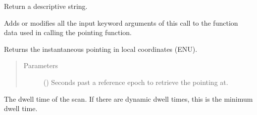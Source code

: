 \documentclass[letterpaper,10pt,english]{sphinxmanual}
\begin{document}
\begin{fulllineitems}

\begin{fulllineitems}
\label{\detokenize{modules/radar_scans:radar_scans.RadarScan.info}}
Return a descriptive string.

\end{fulllineitems}


\begin{fulllineitems}
\label{\detokenize{modules/radar_scans:radar_scans.RadarScan.keyword_arguments}}
Adds or modifies all the input keyword arguments of this call to the function data used in calling the pointing function.

\end{fulllineitems}


\begin{fulllineitems}
\label{\detokenize{modules/radar_scans:radar_scans.RadarScan.local_pointing}}
Returns the instantaneous pointing in local coordinates (ENU).
\begin{quote}\begin{description}
\item[{Parameters}] \leavevmode
{} () \textendash{} Seconds past a reference epoch to retrieve the pointing at.

\end{description}\end{quote}

\end{fulllineitems}


\begin{fulllineitems}
\label{\detokenize{modules/radar_scans:radar_scans.RadarScan.min_dwell_time}}
The dwell time of the scan. If there are dynamic dwell times, this is the minimum dwell time.

\end{fulllineitems}


\end{fulllineitems}
\end{document}
